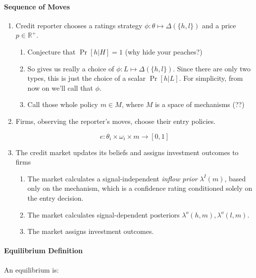 \documentclass{article}
\begin{document}
\paragraph{Sequence of Moves}

\begin{enumerate}
    \item Credit reporter chooses a ratings strategy $\phi : \theta \mapsto \Delta(\{h, l\})$ and a price $p \in \mathbb{R}^+$.
    \begin{enumerate}
        \item Conjecture that $\Pr[h | H] = 1$ (why hide your peaches?)
        \item So gives us really a choice of $\phi : L \mapsto \Delta(\{h, l\})$. Since there are only two types, this is just the choice of a scalar $\Pr[h | L]$. For simplicity, from now on we'll call that $\phi$. 
        \item Call those whole policy $m \in M$, where $M$ is a space of mechanisms (??)
    \end{enumerate}
    \item Firms, observing the reporter's moves, choose their entry policies. 

    \begin{equation}
        e: \theta_i \times \omega_i \times m \to [0, 1]
    \end{equation}

    \item The credit market updates its beliefs and assigns investment outcomes to firms 

    \begin{enumerate}
        \item The market calculates a signal-independent \emph{inflow prior} $\lambda^I(m)$, based only on the mechanism, which is a confidence rating conditioned solely on the entry decision. 
        \item The market calculates signal-dependent posteriors $\lambda^o(h, m), \lambda^o(l, m)$. 
        \item The market assigns investment outcomes. 
    \end{enumerate}
\end{enumerate}

\paragraph{Equilibrium Definition}

An equilibrium is: 
\end{document}
